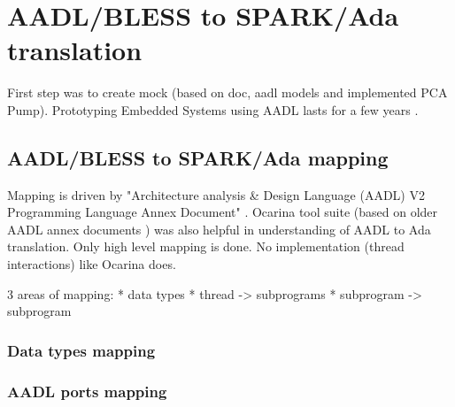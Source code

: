 
\cleardoublepage


\chapter{AADL/BLESS to SPARK/Ada translation}
\label{codegen}

First step was to create mock (based on doc, aadl models and implemented PCA Pump).
Prototyping Embedded Systems using AADL lasts for a few years \cite{PrototypyingAadl:Paper}.

\section{AADL/BLESS to SPARK/Ada mapping}
\label{codegen:mapping}



Mapping is driven by "Architecture analysis \& Design Language (AADL) V2 Programming Language Annex Document" \cite{AnnexDoc13}. Ocarina tool suite (based on older AADL annex documents \cite{Ocarina:Article}) was also helpful in understanding of AADL to Ada translation.
Only high level mapping is done. No implementation (thread interactions) like Ocarina does. 

3 areas of mapping:
* data types
* thread -> subprograms
* subprogram -> subprogram

\subsection{Data types mapping}
\label{codegen:mapping:data}

\subsection{AADL ports mapping}
\label{codegen:mapping:ports}

